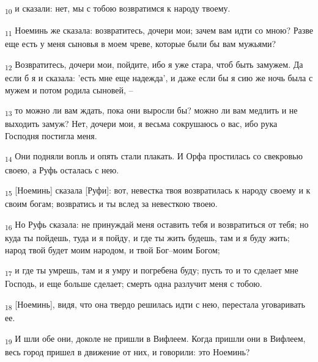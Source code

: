 \begin{tcolorbox}
\textsubscript{10} и сказали: нет, мы с тобою возвратимся к народу твоему.
\end{tcolorbox}
\begin{tcolorbox}
\textsubscript{11} Ноеминь же сказала: возвратитесь, дочери мои; зачем вам идти со мною? Разве еще есть у меня сыновья в моем чреве, которые были бы вам мужьями?
\end{tcolorbox}
\begin{tcolorbox}
\textsubscript{12} Возвратитесь, дочери мои, пойдите, ибо я уже стара, чтоб быть замужем. Да если б я и сказала: 'есть мне еще надежда', и даже если бы я сию же ночь была с мужем и потом родила сыновей, --
\end{tcolorbox}
\begin{tcolorbox}
\textsubscript{13} то можно ли вам ждать, пока они выросли бы? можно ли вам медлить и не выходить замуж? Нет, дочери мои, я весьма сокрушаюсь о вас, ибо рука Господня постигла меня.
\end{tcolorbox}
\begin{tcolorbox}
\textsubscript{14} Они подняли вопль и опять стали плакать. И Орфа простилась со свекровью своею, а Руфь осталась с нею.
\end{tcolorbox}
\begin{tcolorbox}
\textsubscript{15} [Ноеминь] сказала [Руфи]: вот, невестка твоя возвратилась к народу своему и к своим богам; возвратись и ты вслед за невесткою твоею.
\end{tcolorbox}
\begin{tcolorbox}
\textsubscript{16} Но Руфь сказала: не принуждай меня оставить тебя и возвратиться от тебя; но куда ты пойдешь, туда и я пойду, и где ты жить будешь, там и я буду жить; народ твой будет моим народом, и твой Бог--моим Богом;
\end{tcolorbox}
\begin{tcolorbox}
\textsubscript{17} и где ты умрешь, там и я умру и погребена буду; пусть то и то сделает мне Господь, и еще больше сделает; смерть одна разлучит меня с тобою.
\end{tcolorbox}
\begin{tcolorbox}
\textsubscript{18} [Ноеминь], видя, что она твердо решилась идти с нею, перестала уговаривать ее.
\end{tcolorbox}
\begin{tcolorbox}
\textsubscript{19} И шли обе они, доколе не пришли в Вифлеем. Когда пришли они в Вифлеем, весь город пришел в движение от них, и говорили: это Ноеминь?
\end{tcolorbox}
